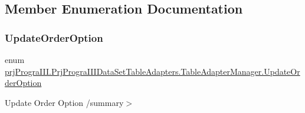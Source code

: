 \subsection{Member Enumeration Documentation}
\hypertarget{classprj_progra_i_i_i_1_1_prj_progra_i_i_i_data_set_table_adapters_1_1_table_adapter_manager_ada8b937dd32f0e82f86deb1a45b384a6}{}\label{classprj_progra_i_i_i_1_1_prj_progra_i_i_i_data_set_table_adapters_1_1_table_adapter_manager_ada8b937dd32f0e82f86deb1a45b384a6} 
\subsubsection{\texorpdfstring{Update\+Order\+Option}{UpdateOrderOption}}
{\footnotesize\ttfamily enum \hyperlink{classprj_progra_i_i_i_1_1_prj_progra_i_i_i_data_set_table_adapters_1_1_table_adapter_manager_ada8b937dd32f0e82f86deb1a45b384a6}{prj\+Progra\+I\+I\+I.\+Prj\+Progra\+I\+I\+I\+Data\+Set\+Table\+Adapters.\+Table\+Adapter\+Manager.\+Update\+Order\+Option}\hspace{0.3cm}{\ttfamily [strong]}}



Update Order Option /summary$>$ 

